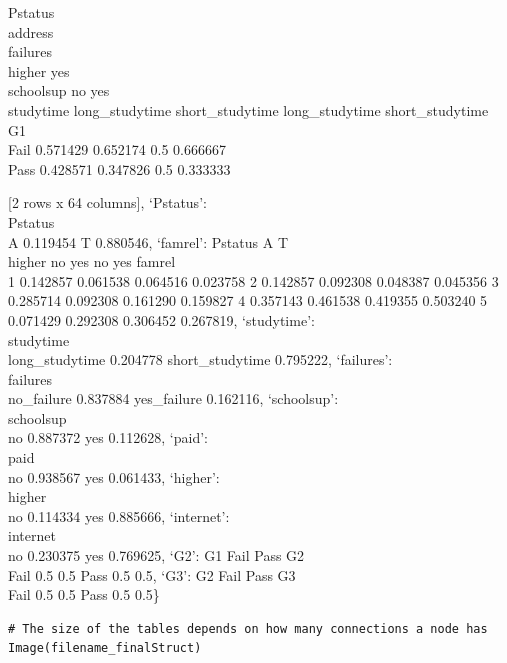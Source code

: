 \documentclass[
]{article}
\begin{document}
Pstatus\\
address\\
failures\\
higher yes\\
schoolsup no yes\\
studytime long\_studytime short\_studytime long\_studytime
short\_studytime\\
G1\\
Fail 0.571429 0.652174 0.5 0.666667\\
Pass 0.428571 0.347826 0.5 0.333333

{[}2 rows x 64 columns{]}, `Pstatus':\\
Pstatus\\
A 0.119454 T 0.880546, `famrel': Pstatus A T\\
higher no yes no yes famrel\\
1 0.142857 0.061538 0.064516 0.023758 2 0.142857 0.092308 0.048387
0.045356 3 0.285714 0.092308 0.161290 0.159827 4 0.357143 0.461538
0.419355 0.503240 5 0.071429 0.292308 0.306452 0.267819, `studytime':\\
studytime\\
long\_studytime 0.204778 short\_studytime 0.795222, `failures':\\
failures\\
no\_failure 0.837884 yes\_failure 0.162116, `schoolsup':\\
schoolsup\\
no 0.887372 yes 0.112628, `paid':\\
paid\\
no 0.938567 yes 0.061433, `higher':\\
higher\\
no 0.114334 yes 0.885666, `internet':\\
internet\\
no 0.230375 yes 0.769625, `G2': G1 Fail Pass G2\\
Fail 0.5 0.5 Pass 0.5 0.5, `G3': G2 Fail Pass G3\\
Fail 0.5 0.5 Pass 0.5 0.5\}

\begin{verbatim}
# The size of the tables depends on how many connections a node has
Image(filename_finalStruct)
\end{verbatim}
\end{document}
